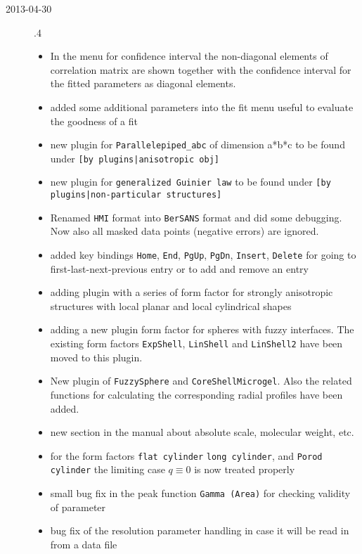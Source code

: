 \begin{description}
    \item[2013-04-30] .4
    \begin{itemize}
      \item In the menu for confidence interval the non-diagonal elements of
            correlation matrix are shown together with the confidence interval
            for the fitted parameters as diagonal elements.
      \item added some additional parameters into the fit menu useful to
            evaluate the goodness of a fit
      \item new plugin for \texttt{Parallelepiped\_abc} of dimension a*b*c to be
            found under \texttt{[by plugins|anisotropic obj]}
      \item new plugin for \texttt{generalized Guinier law} to be found under
            \texttt{[by plugins|non-particular structures]}
      \item Renamed \texttt{HMI} format into \texttt{BerSANS} format and did some debugging.
            Now also all masked data points (negative errors) are ignored.
      \item added key bindings \texttt{Home}, \texttt{End}, \texttt{PgUp}, \texttt{PgDn}, \texttt{Insert},
            \texttt{Delete} for going to first-last-next-previous entry or to add and remove an entry
      \item adding plugin with a series of form factor for strongly anisotropic structures
            with local planar and local cylindrical shapes
      \item adding a new plugin form factor for spheres with fuzzy interfaces. The existing form factors
            \texttt{ExpShell}, \texttt{LinShell} and \texttt{LinShell2} have been moved to this plugin.
      \item New plugin of \texttt{FuzzySphere} and \texttt{CoreShellMicrogel}.
            Also the related functions for calculating the corresponding radial profiles have been added.
      \item new section in the manual about absolute scale, molecular weight, etc.
      \item for the form factors \texttt{flat cylinder} \texttt{long cylinder}, and \texttt{Porod cylinder}
            the limiting case $q \equiv 0$ is now treated properly
      \item small bug fix in the peak function \texttt{Gamma (Area)} for checking
            validity of parameter
      \item bug fix of the resolution parameter handling in case it will be read in from a data file

\end{itemize}
\end{description}
